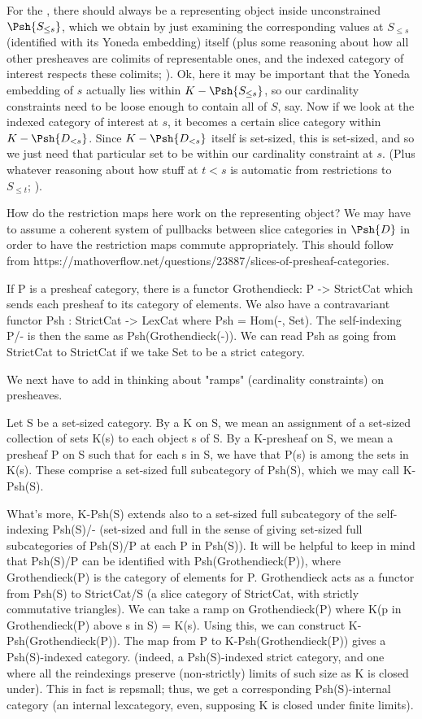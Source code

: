 For the \TODO, there should always be a representing object inside unconstrained $\Psh{S_{\leq s}}$, which we obtain by just examining the corresponding values at $S_{\leq s}$ (identified with its Yoneda embedding) itself (plus some reasoning about how all other presheaves are colimits of representable ones, and the indexed category of interest respects these colimits; \TODO). Ok, here it may be important that the Yoneda embedding of $s$ actually lies within $K-\Psh{S_{\leq s}}$, so our cardinality constraints need to be loose enough to contain all of $S$, say. Now if we look at the indexed category of interest at $s$, it becomes a certain slice category within $K-\Psh{D_{< s}}$. Since $K-\Psh{D_{< s}}$ itself is set-sized, this is set-sized, and so we just need that particular set to be within our cardinality constraint at $s$. (Plus whatever reasoning about how stuff at $t < s$ is automatic from restrictions to $S_{\leq t}$; \TODO).

How do the restriction maps here work on the representing object? We may have to assume a coherent system of pullbacks between slice categories in $\Psh{D}$ in order to have the restriction maps commute appropriately. This should follow from https://mathoverflow.net/questions/23887/slices-of-presheaf-categories.

If P is a presheaf category, there is a functor Grothendieck: P -> StrictCat which sends each presheaf to its category of elements. We also have a contravariant functor Psh : StrictCat -> LexCat where Psh = Hom(-, Set). The self-indexing P/- is then the same as Psh(Grothendieck(-)). We can read Psh as going from StrictCat to StrictCat if we take Set to be a strict category.

We next have to add in thinking about "ramps" (cardinality constraints) on presheaves.

Let S be a set-sized category. By a  K on S, we mean an assignment of a set-sized collection of sets K(s) to each object s of S. By a K-presheaf on S, we mean a presheaf P on S such that for each s in S, we have that P(s) is among the sets in K(s). These comprise a set-sized full subcategory of Psh(S), which we may call K-Psh(S).

What's more, K-Psh(S) extends also to a set-sized full subcategory of the self-indexing Psh(S)/- (set-sized and full in the sense of giving set-sized full subcategories of Psh(S)/P at each P in Psh(S)). It will be helpful to keep in mind that Psh(S)/P can be identified with Psh(Grothendieck(P)), where Grothendieck(P) is the category of elements for P. Grothendieck acts as a functor from Psh(S) to StrictCat/S (a slice category of StrictCat, with strictly commutative triangles). We can take a ramp on Grothendieck(P) where K(p in Grothendieck(P) above s in S) = K(s). Using this, we can construct K-Psh(Grothendieck(P)). The map from P to K-Psh(Grothendieck(P)) gives a Psh(S)-indexed category. (indeed, a Psh(S)-indexed strict category, and one where all the reindexings preserve (non-strictly) limits of such size as K is closed under). This in fact is repsmall; thus, we get a corresponding Psh(S)-internal category (an internal lexcategory, even, supposing K is closed under finite limits).

